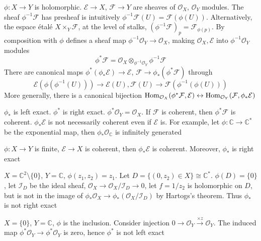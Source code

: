 \documentclass[../main.tex]{subfiles}
\begin{document}
\begin{definition}
$\phi:X\to Y$ is holomorphic. $\mathcal E\to X$, $\mathcal F\to Y$ are sheaves of $\mathcal O_X$, $\mathcal O_Y$ modules. The sheaf $\phi^{-1}\mathcal F$ has presheaf is intuitively $\phi^{-1}\mathcal F(U)=\mathcal F(\phi(U))$. Alternatively, the espace \'etal\'e $X\times_Y\mathcal F$, at the level of stalks, $(\phi^{-1}\mathcal F)_p=\mathcal F_{\phi(p)}$. By composition with $\phi$ defines a sheaf map $\phi^{-1}\mathcal O_Y\to\mathcal O_X$, making $\mathcal O_X, \mathcal E$ into $\phi^{-1}\mathcal O_Y$ modules
\[\phi^*\mathcal F=\mathcal O_X\otimes_{\phi^{-1}\mathcal O_Y}\phi^{-1}\mathcal F\]
There are canonical maps $\phi^*(\phi_*\mathcal E)\to\mathcal E$, $\mathcal F\to\phi_*(\phi^*\mathcal F)$ through
\[\mathcal E(\phi(\phi^{-1}(U)))\to\mathcal E(U),\mathcal F(U)\to\mathcal F(\phi^{-1}(\phi(U)))\]
More generally, there is a canonical bijection $\operatorname{Hom}_{\mathcal O_X}(\phi^*\mathcal F,\mathcal E)\leftrightarrow\operatorname{Hom}_{\mathcal O_Y}(\mathcal F,\phi_*\mathcal E)$
\end{definition}

\begin{fact}
$\phi_*$ is left exact. $\phi^*$ is right exact. $\phi^*\mathcal O_Y=\mathcal O_X$. If $\mathcal F$ is coherent, then $\phi^*\mathcal F$ is coherent. $\phi_*\mathcal E$ is not necessarily coherent even if $\mathcal E$ is. For example, let $\phi:\mathbb C\to\mathbb C^*$ be the exponential map, then $\phi_*\mathcal O_{\mathbb C}$ is infinitely generated
\end{fact}

\begin{theorem}
$\phi:X\to Y$ is finite, $\mathcal E\to X$ is coherent, then $\phi_*\mathcal E$ is coherent. Moreover, $\phi_*$ is right exact
\end{theorem}

\begin{example}
$X=\mathbb C^2\setminus\{0\}$, $Y=\mathbb C$, $\phi(z_1,z_2)=z_1$. Let $D=\{(0,z_2)\in X\}\cong\mathbb C^*$. $\phi(D)=\{0\}$, let $\mathcal I_D$ be the ideal sheaf, $\mathcal O_X\to\mathcal O_X/\mathcal I_D\to0$, let $f=1/z_2$ is holomorphic on $D$, but is not in the image of $\phi_*\mathcal O_X\to\phi_*(\mathcal O_X/\mathcal I_D)$ by Hartogs's theorem. Thus $\phi_*$ is not right exact
\end{example}

\begin{example}
$X=\{0\}$, $Y=\mathbb C$, $\phi$ is the inclusion. Consider injection $0\to\mathcal O_Y\xrightarrow{\times z}\mathcal O_Y$. The induced map $\phi^*\mathcal O_Y\to\phi^*\mathcal O_Y$ is zero, hence $\phi^*$ is not left exact
\end{example}
\end{document}
